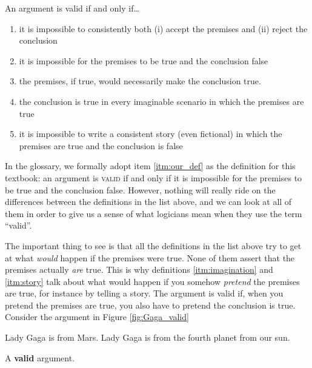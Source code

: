 An argument is valid if and only if\ldots
\begin{enumerate}[label=(\alph*)]
\item it is impossible to consistently both (i) accept the premises and (ii) reject the conclusion

\item \label{itm:our_def} it is impossible for the premises to be true and the conclusion false

\item \label{itm:necessary} the premises, if true, would necessarily make the conclusion true.

\item \label{itm:imagination} the conclusion is true in every imaginable scenario in which the premises are true

\item \label{itm:story} it is impossible to write a consistent story (even fictional) in which the premises are true and the conclusion is false

\end{enumerate}

In the glossary, we formally adopt item \ref{itm:our_def} as the definition for this textbook: an argument is \textsc{\gls{valid}} \label{def:valid} if and only if it is impossible for the premises to be true and the conclusion false.  However, nothing will really ride on the differences between the definitions in the list above, and we can look at all of them in order to give us a sense of what logicians mean when they use the term ``valid''.

The important thing to see is that all the definitions in the list above try to get at what \textit{would} happen if the premises were true. None of them assert that the premises actually \textit{are} true. This is why definitions \ref{itm:imagination} and \ref{itm:story} talk about what would happen if you somehow \textit{pretend} the premises are true, for instance by telling a story. The argument is valid if, when you pretend the premises are true, you also have to pretend the conclusion is true. Consider the argument in Figure \ref{fig:Gaga_valid}


\begin{marginfigure}
\begin{earg}
\item Lady Gaga is from Mars.
\itemc Lady Gaga is from the fourth planet from our sun.
\end{earg}
\caption{A \textbf{valid} argument.}
\label{fig:Gaga_valid}
\end{marginfigure}

